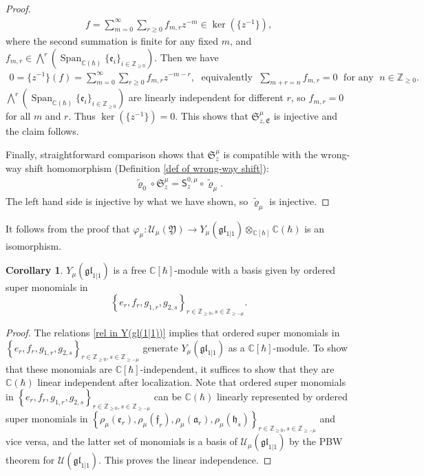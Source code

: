 \documentclass[10pt]{amsart}
\theoremstyle{definition}
\newtheorem{Corollary}[Theorem]{Corollary}
\numberwithin{equation}{section}
\newcommand{\bC}{\mathbb{C}}
\newcommand{\bZ}{\mathbb{Z}}
\newcommand{\sS}{\mathsf{S}}
\newcommand{\Span}{\operatorname{Span}}
\begin{document}
\begin{proof}
\begin{align*}
f=\sum_{m=0}^{\infty}\sum_{r\geqslant 0}f_{m,r}z^{-m}\in \ker(\{z^{-1}\}),
\end{align*}
where the second summation is finite for any fixed $m$, and $f_{m,r}\in \bigwedge^r\left(\Span_{\bC(\hbar)}\{\mathfrak{e}_i\}_{i\in \bZ_{\geqslant 0}}\right)$. Then we have
\begin{align*}
0=\{z^{-1}\}(f)=\sum_{m=0}^{\infty}\sum_{r\geqslant 0}f_{m,r}z^{-m-r},\;\text{ equivalently }\;\sum_{m+r=n}f_{m,r}=0\; \text{ for any }\; n\in \bZ_{\geqslant0}.
\end{align*}
$\bigwedge^r\left(\Span_{\bC(\hbar)}\{\mathfrak{e}_i\}_{i\in \bZ_{\geqslant 0}}\right)$ are linearly independent for different $r$, so $f_{m,r}=0$ for all $m$ and $r$. Thus $\ker(\{z^{-1}\})=0$. This shows that $\mathfrak{S}_{z,\mathfrak{E}}^\mu$ is injective and the claim follows.

Finally, straightforward comparison shows that $\mathfrak{S}_z^\mu$ is compatible with the wrong-way shift homomorphism (Definition \ref{def of wrong-way shift}):
\begin{align*}
    \widetilde{\varrho}_0\circ\mathfrak{S}_z^\mu=\sS^{0,\mu}_z\circ \widetilde{\varrho}_\mu.
\end{align*}
The left hand side is injective by what we have shown, so $\widetilde{\varrho}_\mu$ is injective.
\end{proof}

It follows from the proof that $\varphi_\mu\colon \mathcal U_\mu(\mathfrak{Y})\to Y_\mu(\mathfrak{gl}_{1|1})\otimes_{\bC[\hbar]}\bC(\hbar)$ is an isomorphism.

\begin{Corollary}\label{cor PBW Y(gl(1|1))}
$Y_\mu(\mathfrak{gl}_{1|1})$ is a free $\bC[\hbar]$-module with a basis given by ordered super monomials in 
$$\left\{e_{r},f_r,g_{1,r},g_{2,s}\right\}_{r\in \bZ_{\geqslant0},s\in \bZ_{\geqslant-\mu}}. $$
\end{Corollary}

\begin{proof}
The relations \eqref{rel in Y(gl(1|1))} implies that ordered super monomials in $\left\{e_{r},f_r,g_{1,r},g_{2,s}\right\}_{r\in \bZ_{\geqslant0},s\in \bZ_{\geqslant-\mu}}$ generate $Y_\mu(\mathfrak{gl}_{1|1})$ as a $\bC[\hbar]$-module. To show that these monomials are $\bC[\hbar]$-independent, it suffices to show that they are $\bC(\hbar)$ linear independent after localization. Note that ordered super monomials in $\left\{e_{r},f_r,g_{1,r},g_{2,s}\right\}_{r\in \bZ_{\geqslant0},s\in \bZ_{\geqslant-\mu}}$ can be $\bC(\hbar)$ linearly represented by ordered super monomials in $\left\{\rho_\mu(\mathfrak{e}_{r}),\rho_\mu(\mathfrak{f}_{r}),\rho_\mu(\mathfrak{a}_{r}),\rho_\mu(\mathfrak{h}_{s})\right\}_{r\in \bZ_{\geqslant0},s\in \bZ_{\geqslant-\mu}}$ and vice versa, and the latter set of monomials is a basis of $\mathcal U_\mu(\mathfrak{gl}_{1|1})$ by the PBW theorem for $\mathcal U(\mathfrak{gl}_{1|1})$. This proves the linear independence.
\end{proof}
\end{document}
